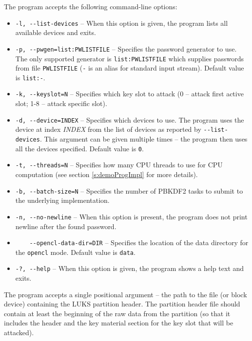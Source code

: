 \documentclass[12pt,oneside]{fithesis2}
\begin{document}
      The program accepts the following command-line options:
      \begin{itemize}
        \item \verb|-l, --list-devices| -- When this option is given, the program lists all available devices and exits.
        \item \verb|-p, --pwgen=list:PWLISTFILE| -- Specifies the password generator to use. The only supported generator is \verb|list:PWLISTFILE| which supplies passwords from file \verb|PWLISTFILE| (\verb|-| is an alias for standard input stream). Default value is \verb|list:-|.
        \item \verb|-k, --keyslot=N| -- Specifies which key slot to attack (0 -- attack first active slot; 1-8 -- attack specific slot).
        \item \verb|-d, --device=INDEX| -- Specifies which devices to use. The program uses the device at index \emph{INDEX} from the list of devices as reported by \verb|--list-devices|. This argument can be given multiple times -- the program then uses all the devices specified. Default value is \verb|0|.
        \item \verb|-t, --threads=N| -- Specifies how many CPU threads to use for CPU computation (see section \ref{s:demoProgImpl} for more details).
        \item \verb|-b, --batch-size=N| -- Specifies the number of PBKDF2 tasks to submit to the underlying implementation.
        \item \verb|-n, --no-newline| -- When this option is present, the program does not print newline after the found password.
        \item \verb|    --opencl-data-dir=DIR| -- Specifies the location of the data directory for the \verb|opencl| mode. Default value is \verb|data|.
        \item \verb|-?, --help| -- When this option is given, the program shows a help text and exits.
      \end{itemize}
      The program accepts a single positional argument -- the path to the file (or block device) containing the LUKS partition header. The partition header file should contain at least the beginning of the raw data from the partition (so that it includes the header and the key material section for the key slot that will be attacked).
      
\end{document}
